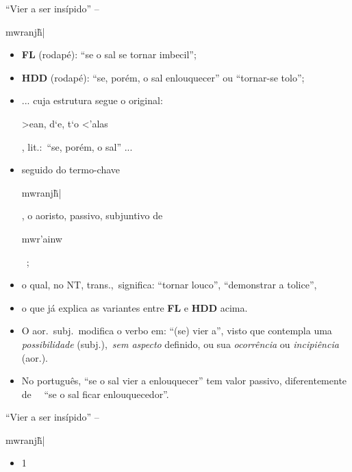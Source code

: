 \documentclass[12pt,aspectratio=169]{beamer}
\newcommand{\RED}[1]{{\textcolor{TXred}{#1}}}
\newcommand{\YEL}[1]{{\textcolor{TXyel}{#1}}}
\newcommand{\GRE}[1]{{\textcolor{TXgre}{#1}}}
\newcommand{\CYA}[1]{{\textcolor{TXcya}{#1}}}
\newcommand{\MAG}[1]{{\textcolor{TXmag}{#1}}}
\newcommand{\BRI}[1]{{\textcolor{BSpbg}{#1}}}   %
\newcommand{\GRtxt}[1]{\begin{otherlanguage}{greek}{{#1}}\end{otherlanguage}}
\begin{document}
    \begin{frame}{\BRI{``Vier a ser insípido''} -- \GRtxt{mwranj\~h|}}
        \begin{itemize}
            \item<1-> \BRI{\textbf{FL}} (rodapé): \MAG{``se o sal se tornar imbecil''};
                \\[\medskipamount]
            \item<2-> \BRI{\textbf{HDD}} (rodapé): \MAG{``se, porém, o sal enlouquecer''} ou
                \MAG{``tornar-se tolo''};
                \\[\medskipamount]
            \item<3-> ... cuja estrutura segue o original: \YEL{\GRtxt{>ean, d`e, t`o <'alas}},
                lit.:~\MAG{``se, porém, o sal''} ...
                \\[\medskipamount]
            \item<4-> seguido do termo-chave \BRI{\GRtxt{mwranj\~h|}}, o \GRE{aoristo},
                \GRE{passivo}, \GRE{subjuntivo} de
                \BRI{\GRtxt{mwr'ainw}}~\cite{2013-MounceWD-VidaNova,
                2007-FribergB+FribergT-VidaNova, 2009-MounceWD-Vida}; %
                \\[\medskipamount]
            \item<5-> o qual, no NT, trans.,~significa: \CYA{``tornar louco''},
                \CYA{``demonstrar a tolice''},
                \\[\medskipamount]
            \item<6-> o que já explica as variantes entre \BRI{\textbf{FL}} e \BRI{\textbf{HDD}}
                acima.
                \\[\medskipamount]
            \item<7-> O \GRE{aor.~subj.}~modifica o verbo em: \CYA{``}(se) \CYA{vier a''}, visto
                que contempla uma \BRI{\textit{possibilidade}} (\GRE{subj.}),~\BRI{\textit{sem
                aspecto}} definido, ou sua \BRI{\textit{ocorrência}} ou
                \BRI{\textit{incipiência}} (\GRE{aor.}).
                \\[\medskipamount]
            \item<8-> No português, \MAG{``se o sal vier a enlouquecer''} tem valor
                \GRE{passivo}, diferentemente de \ \ \RED{``se o sal ficar enlouquecedor''}.
        \end{itemize}
    \end{frame}

    \begin{frame}{\BRI{``Vier a ser insípido''} -- \GRtxt{mwranj\~h|}}
        \begin{itemize}
            \item 1
        \end{itemize}
    \end{frame}
\end{document}
